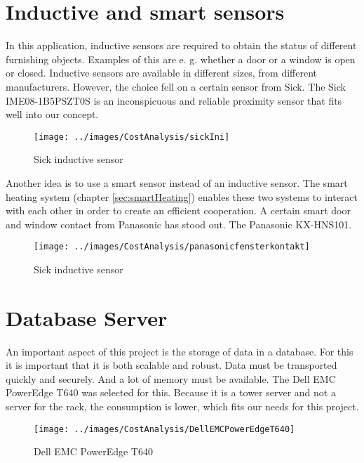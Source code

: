 \section{Inductive and smart sensors}
In this application, inductive sensors are required to obtain the status of different furnishing objects. Examples of this are e. g. whether a door or a window is open or closed. Inductive sensors are available in different sizes, from different manufacturers. However, the choice fell on a certain sensor from Sick. The Sick IME08-1B5PSZT0S is an inconspicuous and reliable proximity sensor that fits well into our concept. 

\begin{figure}[h]
	\centering
	\texttt{[image: ../images/CostAnalysis/sickIni]} 
	\caption{Sick inductive sensor}
	\label{fig:sickIni}
\end{figure}

Another idea is to use a smart sensor instead of an inductive sensor. The smart heating system (chapter \ref{sec:smartHeating}) enables these two systems to interact with each other in order to create an efficient cooperation. A certain smart door and window contact from Panasonic has stood out. The Panasonic KX-HNS101.

\begin{figure}[h]
	\centering
	\texttt{[image: ../images/CostAnalysis/panasonicfensterkontakt]} 
	\caption{Sick inductive sensor}
	\label{fig:panasonicSmart}
\end{figure}

\section{Database Server}
An important aspect of this project is the storage of data in a database. For this it is important that it is both scalable and robust. Data must be transported quickly and securely. And a lot of memory must be available. The Dell EMC PowerEdge T640 was selected for this. Because it is a tower server and not a server for the rack, the consumption is lower, which fits our needs for this project.

\begin{figure}[h]
	\centering
	\texttt{[image: ../images/CostAnalysis/DellEMCPowerEdgeT640]} 
	\caption{Dell EMC PowerEdge T640}
	\label{fig:dbServer}
\end{figure}

